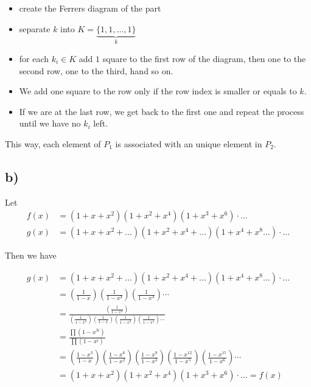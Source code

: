 \documentclass[a4paper,11pt]{report}
\begin{document}
\begin{itemize}
\item create the Ferrers diagram of the part
\item separate $k$ into $K =  \underbrace{\{1,1,\dots,1\}}_{k}$
\item for each $k_i \in K$ add $1$ square to the first row of the diagram, then
  one to the second row, one to the third, hand so on.
\item We add one square to the row only if the row index is smaller or equals to
  $k$.
\item If we are at the last row, we get back to the first one and repeat the
  process until we have no $k_i$ left.
\end{itemize}

This way, each element of $P_1$ is associated with an unique element in $P_2$.

\subsection*{b)}

Let
\begin{align*}
  f(x) &= (1+x+x^2)(1+x^2+x^4)(1+x^3+x^6)\cdot\dots \\
  g(x) &= (1+x+x^2+\dots)(1+x^2+x^4+\dots)(1+x^4+x^8\dots)\cdot\dots
\end{align*}

Then we have

\begin{align*}
  g(x) &= (1+x+x^2+\dots)(1+x^2+x^4+\dots)(1+x^4+x^8\dots)\cdot\dots \\
       &= (\frac{1}{1-x})(\frac{1}{1-x²})(\frac{1}{1-x^4})\cdots\\
       &= \frac{(\frac{1}{1-x^3})}{(\frac{1}{1-x^3})(\frac{1}{1-x})(\frac{1}{1-x^2})(\frac{1}{1-x^4})\cdots}\\
       &= \frac{\prod (1-x^{3i})}{\prod (1-x^i)}\\
       &= (\frac{1-x^3}{1-x})(\frac{1-x^6}{1-x^2})(\frac{1-x^9}{1-x^3})(\frac{1-x^{12}}{1-x^5})(\frac{1-x^{15}}{1-x^6})\cdots\\
       &= (1+x+x^2)(1+x^2+x^4)(1+x^3+x^6)\cdot\dots = f(x)\\
\end{align*}
\end{document}
